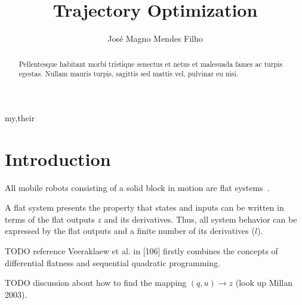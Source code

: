 \documentclass[eprint]{actapoly}
\begin{document}
\title[Trajectory Generation Approach]
{Trajectory Optimization}

\author[J. M. Mendes Filho]{Jos\'{e} Magno Mendes Filho}{my,their}


\begin{abstract}
Pellentesque habitant morbi tristique senectus et netus et malesuada fames ac turpis egestas.
Nullam mauris turpis, sagittis sed mattis vel, pulvinar eu nisi.
\end{abstract}


\maketitle




\section{Introduction}




All mobile robots consisting of a solid block in motion are flat systems~\cite{Defoort2007a}.

A flat system presents the property that states and inputs can be written in terms of the flat outputs $z$ and its derivatives.
Thus, all system behavior can be expressed by the flat outputs and a finite number of its derivatives ($l$).

TODO reference Veeraklaew et al. in [106] firstly combines the concepts of differential flatness and sequential quadratic programming.

TODO discussion about how to find the mapping $(q, u) \rightarrow z$ (look up Millan 2003).
\end{document}
